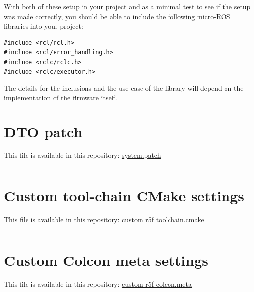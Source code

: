 \documentclass[10pt]{article}
\begin{document}
\pagebreak
With both of these setup in your project and as a minimal test to see if the setup was made correctly,
you should be able to include the following micro-ROS libraries into your project:
\begin{verbatim}
#include <rcl/rcl.h>
#include <rcl/error_handling.h>
#include <rclc/rclc.h>
#include <rclc/executor.h>
\end{verbatim}

The details for the inclusions and the use-case of the library will depend on the implementation
of the firmware itself.
\clearpage
\section{DTO patch}
\label{sec:org7ca38e5}
This file is available in this repository: \href{https://gitlab.com/sunoc/xilinx-kria-kv260-documentation/-/blob/b7300116e153f4b5a1542f8804e4646db8030033/src/system.patch}{system.patch}
\inputminted[linenos, frame=single]{diff}{./src/system.patch}

\clearpage
\section{Custom tool-chain CMake settings}
\label{sec:org05a186e}
This file is available in this repository: \href{https://gitlab.com/sunoc/xilinx-kria-kv260-documentation/-/blob/b7300116e153f4b5a1542f8804e4646db8030033/src/custom\_r5f\_toolchain.cmake}{custom r5f toolchain.cmake}
\inputminted[linenos, frame=single]{cmake}{./src/custom_r5f_toolchain.cmake}

\clearpage
\section{Custom Colcon meta settings}
\label{sec:org38b88f0}
This file is available in this repository: \href{https://gitlab.com/sunoc/xilinx-kria-kv260-documentation/-/blob/b7300116e153f4b5a1542f8804e4646db8030033/src/custom\_r5f\_colcon.meta}{custom r5f colcon.meta}
\inputminted[linenos, frame=single]{yaml}{./src/custom_r5f_colcon.meta}

\pagebreak
\end{document}
